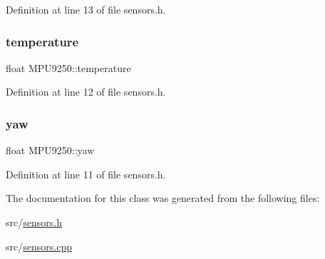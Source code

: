 Definition at line 13 of file sensors.\+h.

\mbox{\label{classMPU9250_a2190394242c2b74ff53c20f8180af287}} 
\subsubsection{\texorpdfstring{temperature}{temperature}}
{\footnotesize\ttfamily float M\+P\+U9250\+::temperature}



Definition at line 12 of file sensors.\+h.

\mbox{\label{classMPU9250_a0493fbbf09cb14b8695a1eb804136e34}} 
\subsubsection{\texorpdfstring{yaw}{yaw}}
{\footnotesize\ttfamily float M\+P\+U9250\+::yaw}



Definition at line 11 of file sensors.\+h.



The documentation for this class was generated from the following files\+:\begin{DoxyCompactItemize}
\item 
src/\hyperlink{sensors_8h}{sensors.\+h}\item 
src/\hyperlink{sensors_8cpp}{sensors.\+cpp}\end{DoxyCompactItemize}
